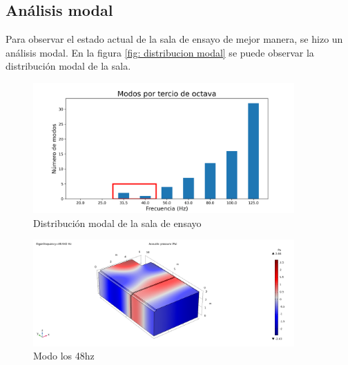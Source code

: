 \subsection{Análisis modal}
Para observar el estado actual de la sala de ensayo de mejor manera, se hizo un análisis modal. En la figura \ref{fig: distribucion modal} se puede observar la distribución modal de la sala.
\begin{figure}[H]
    \centering
    \includegraphics[width=10cm]{Imagenes/Modos/densidad modal.png}
    \caption{Distribución modal de la sala de ensayo}
    \label{fig:distribucion modal}
\end{figure}

\begin{figure}[H]
    \centering
    \includegraphics[width=10cm]{Imagenes/Modos/modo_48hz.png}
    \caption{Modo los 48hz}
    \label{fig:modo a los 48hz}
\end{figure}